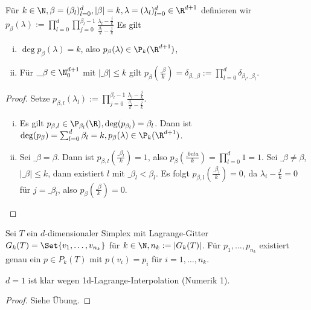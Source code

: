 
\begin{lem} \label{3.68}
	Für $k \in \N, \beta = (\beta_l)_{l=0}^d, |\beta| = k, \lambda = (\lambda_l)_{l=0}^d \in \R^{d+1}$ definieren wir
	\begin{math}
		p_\beta(\lambda)
		:= \prod_{l=0}^d \prod_{j=0}^{\beta_l - 1} \frac{\lambda_l - \frac{j}{k}}{\frac{\beta_l}{k} - \frac{j}{k}}
	\end{math}
	Es gilt
	\begin{enumerate}[i)]
		\item
			$\deg p_\beta(\lambda) = k$, also $p_\beta(\lambda) \in \P_k(\R^{d+1})$,
		\item
			Für $\_\beta \in \N_0^{d+1}$ mit $|\_\beta| \le k$ gilt $p_\beta(\frac{\_\beta}{k}) = \delta_{\beta,\_\beta} := \prod_{l = 0}^d \delta_{\beta_l, \_\beta_l}$.
	\end{enumerate}
	\begin{proof}
		Setze
		\begin{math}
			p_{\beta,l}(\lambda_l) := \prod_{j=0}^{\beta_l - 1} \frac{\lambda_l - \frac{j}{k}}{\frac{\beta_l}{k}-\frac{j}{k}}.
		\end{math}
		\begin{enumerate}[i)]
			\item
				Es gilt $p_{\beta,l} \in \P_{\beta_l}(\R), \deg(p_{\beta_l}) = \beta_l$.
				Dann ist $\deg(p_\beta) = \sum_{l=0}^d \beta_l = k, p_\beta(\lambda) \in \P_k(\R^{d+1})$.
			\item
				Sei $\_\beta = \beta$.
				Dann ist $p_{\beta,l}(\frac{\_\beta_l}{k}) = 1$, also $p_\beta(\frac{\_beta}{k}) = \prod_{l=0}^d 1 = 1$.
				Sei $\_\beta \neq \beta$, $|\_\beta| \le k$, dann existiert $l$ mit $\_\beta_l < \beta_l$.
				Es folgt $p_{\beta, l}(\frac{\_\beta_l}{k}) = 0$, da $\lambda_i - \frac{j}{k} = 0$ für $j = \_\beta_l$, also $p_\beta(\frac{\_\beta}{k}) = 0$.
		\end{enumerate}
	\end{proof}
\end{lem}

\begin{st} \label{3.69}
	Sei $T$ ein $d$-dimensionaler Simplex mit Lagrange-Gitter $G_k(T) = \Set{v_1, \dotsc, v_{n_k}}$ für $k \in \N, n_k := |G_k(T)|$.
	Für $p_1, \dotsc, p_{n_k}$ existiert genau ein $p \in P_k(T)$ mit $p(v_i) = p_i$ für $i = 1, \dotsc, n_k$.
	\begin{note}
		$d = 1$ ist klar wegen 1d-Lagrange-Interpolation (Numerik 1).
	\end{note}
	\begin{proof}
		Siehe Übung.
	\end{proof}
\end{st}

